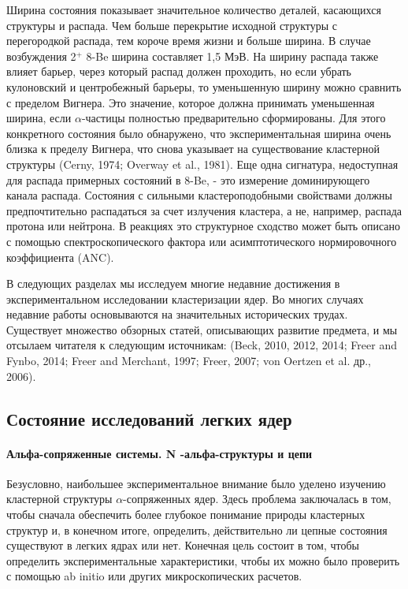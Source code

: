 \documentclass[fontsize=14pt]{scrarticle}
\begin{document}
Ширина состояния показывает значительное количество деталей, касающихся структуры и распада. Чем больше перекрытие исходной структуры с перегородкой распада, тем короче время жизни и больше ширина. В случае возбуждения 2$^{+}$ 8-Be ширина составляет 1,5 МэВ. На ширину распада также влияет барьер, через который распад должен проходить, но если убрать кулоновский и центробежный барьеры, то уменьшенную ширину можно сравнить с пределом Вигнера. Это значение, которое должна принимать уменьшенная ширина, если $\alpha$-частицы полностью предварительно сформированы. Для этого конкретного состояния было обнаружено, что экспериментальная ширина очень близка к пределу Вигнера, что снова указывает на существование кластерной структуры (Cerny, 1974; Overway et al., 1981). Еще одна сигнатура, недоступная для распада примерных состояний в 8-Be, - это измерение доминирующего канала распада. Состояния с сильными кластероподобными свойствами должны предпочтительно распадаться за счет излучения кластера, а не, например, распада протона или нейтрона. В реакциях это структурное сходство может быть описано с помощью спектроскопического фактора или асимптотического нормировочного коэффициента (ANC).

В следующих разделах мы исследуем многие недавние достижения в экспериментальном исследовании кластеризации ядер. Во многих случаях недавние работы основываются на значительных исторических трудах. Существует множество обзорных статей, описывающих развитие предмета, и мы отсылаем читателя к следующим источникам: (Beck, 2010, 2012, 2014; Freer and Fynbo, 2014; Freer and Merchant, 1997; Freer, 2007; von Oertzen et al. др., 2006).

\subsection{ Состояние исследований легких ядер}
\paragraph{ Альфа-сопряженные системы. N -альфа-структуры и цепи}
\hspace{0.6cm}

Безусловно, наибольшее экспериментальное внимание было уделено изучению кластерной структуры $\alpha$-сопряженных ядер. Здесь проблема заключалась в том, чтобы сначала обеспечить более глубокое понимание природы кластерных структур и, в конечном итоге, определить, действительно ли цепные состояния существуют в легких ядрах или нет. Конечная цель состоит в том, чтобы определить экспериментальные характеристики, чтобы их можно было проверить с помощью ab initio или других микроскопических расчетов.
\end{document}

